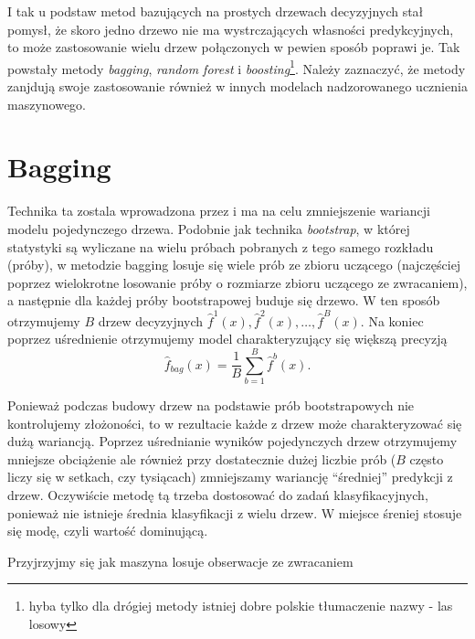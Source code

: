 \documentclass[]{book}
\let\rmarkdownfootnote\footnote%
\def\footnote{\protect\rmarkdownfootnote}
\theoremstyle{plain}
\theoremstyle{definition}
\begin{document}
I tak u podstaw metod bazujących na prostych drzewach decyzyjnych stał pomysł, że skoro jedno drzewo nie ma wystrczających własności predykcyjnych, to może zastosowanie wielu drzew połączonych w pewien sposób poprawi je. Tak powstały metody \emph{bagging}, \emph{random forest} i \emph{boosting}\footnote{hyba tylko dla drógiej metody istniej dobre polskie tłumaczenie nazwy - las losowy}. Należy zaznaczyć, że metody zanjdują swoje zastosowanie również w innych modelach nadzorowanego ucznienia maszynowego.

\hypertarget{bagging}{%
\section{Bagging}\label{bagging}}

Technika ta zostala wprowadzona przez \citet{Breiman1996} i ma na celu zmniejszenie wariancji modelu pojedynczego drzewa. Podobnie jak technika \emph{bootstrap}, w której statystyki są wyliczane na wielu próbach pobranych z tego samego rozkładu (próby), w metodzie bagging losuje się wiele prób ze zbioru uczącego (najczęściej poprzez wielokrotne losowanie próby o rozmiarze zbioru uczącego ze zwracaniem), a następnie dla każdej próby bootstrapowej buduje się drzewo. W ten sposób otrzymujemy \(B\) drzew decyzyjnych \(\hat{f}^1(x), \hat{f}^2(x),\ldots, \hat{f}^B(x)\). Na koniec poprzez uśrednienie otrzymujemy model charakteryzujący się większą precyzją
\begin{equation}
    \hat{f}_{bag}(x)=\frac1B\sum_{b=1}^B\hat{f}^b(x).
\end{equation}

Ponieważ podczas budowy drzew na podstawie prób bootstrapowych nie kontrolujemy złożoności, to w rezultacie każde z drzew może charakteryzować się dużą wariancją. Poprzez uśrednianie wyników pojedynczych drzew otrzymujemy mniejsze obciążenie ale również przy dostatecznie dużej liczbie prób (\(B\) często liczy się w setkach, czy tysiącach) zmniejszamy wariancję ``średniej'' predykcji z drzew. Oczywiście metodę tą trzeba dostosować do zadań klasyfikacyjnych, ponieważ nie istnieje średnia klasyfikacji z wielu drzew. W miejsce śreniej stosuje się modę, czyli wartość dominującą.

Przyjrzyjmy się jak maszyna losuje obserwacje ze zwracaniem
\end{document}
